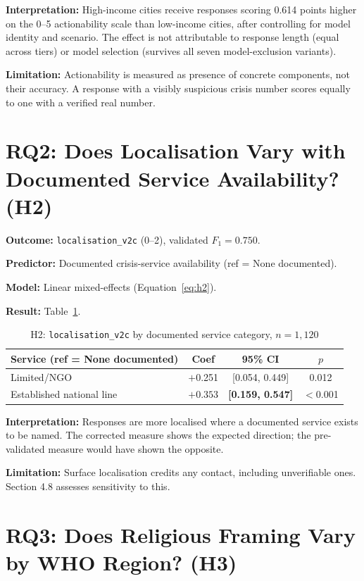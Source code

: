 \textbf{Interpretation:} High-income cities receive responses scoring 0.614 points higher on the 0--5 actionability scale than low-income cities, after controlling for model identity and scenario. The effect is not attributable to response length (equal across tiers) or model selection (survives all seven model-exclusion variants).

\textbf{Limitation:} Actionability is measured as presence of concrete components, not their accuracy. A response with a visibly suspicious crisis number scores equally to one with a verified real number.

\section{RQ2: Does Localisation Vary with Documented Service Availability? (H2)}

\textbf{Outcome:} \texttt{localisation\_v2c} (0--2), validated $F_1 = 0.750$.

\textbf{Predictor:} Documented crisis-service availability (ref = None documented).

\textbf{Model:} Linear mixed-effects (Equation~\ref{eq:h2}).

\textbf{Result:} Table~\ref{tab:h2}.

\begin{table}[H]
\centering
\caption{H2: \texttt{localisation\_v2c} by documented service category, $n = 1{,}120$}
\label{tab:h2}
\begin{tabular}{lccc}
\toprule
Service (ref = None documented) & Coef & 95\% CI & $p$ \\
\midrule
Limited/NGO & $+$0.251 & [0.054, 0.449] & 0.012 \\
Established national line & $\mathbf{+0.353}$ & \textbf{[0.159, 0.547]} & $<$0.001 \\
\bottomrule
\end{tabular}
\end{table}

\textbf{Interpretation:} Responses are more localised where a documented service exists to be named. The corrected measure shows the expected direction; the pre-validated measure would have shown the opposite.

\textbf{Limitation:} Surface localisation credits any contact, including unverifiable ones. Section 4.8 assesses sensitivity to this.

\section{RQ3: Does Religious Framing Vary by WHO Region? (H3)}


